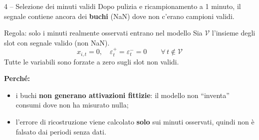 \documentclass[aspectratio=169]{beamer}
\newcommand{\ep}{\varepsilon^{+}}
\newcommand{\en}{\varepsilon^{-}}
\begin{document}
\begin{frame}{4 -- Selezione dei minuti validi}
  Dopo pulizia e ricampionamento a 1 minuto, il segnale contiene ancora dei \textbf{buchi} (NaN)
  dove non c'erano campioni validi.
  \vspace{0.5em}
  \begin{block}{Regola: solo i minuti realmente osservati entrano nel modello}
    Sia $\mathcal{V}$ l'insieme degli slot con segnale valido (non NaN).
    \[
      x_{i,t} = 0,\quad \ep_t = \en_t = 0 \qquad \forall\, t \notin \mathcal{V}
    \]
    Tutte le variabili sono forzate a zero sugli slot non validi.
  \end{block}

  \vspace{0.4em}
  \textbf{Perch\'e:}
  \begin{itemize}
    \item i buchi \textbf{non generano attivazioni fittizie}: il modello non ``inventa'' consumi
          dove non ha misurato nulla;
    \item l'errore di ricostruzione viene calcolato \textbf{solo} sui minuti osservati, quindi non
          \`e falsato dai periodi senza dati.
  \end{itemize}
\end{frame}
\end{document}
